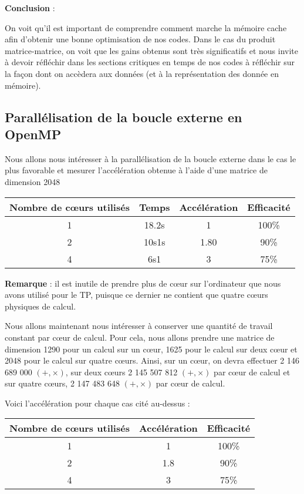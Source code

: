 \documentclass[fleqn,11pt]{article}
\begin{document}
\textbf{Conclusion} : 

On voit qu'il est important de comprendre comment marche la mémoire cache afin d'obtenir une bonne optimisation de nos codes.
Dans le cas du produit matrice-matrice, on voit que les gains obtenus sont très significatifs et nous invite à devoir réfléchir dans les 
sections critiques en temps de nos codes à réfléchir sur la façon dont on accèdera aux données (et à la représentation des donnée en mémoire).

\subsection{Parallélisation de la boucle externe en OpenMP}

Nous allons nous intéresser à la parallélisation de la boucle externe dans le cas le plus favorable et mesurer l'accélération obtenue
à l'aide d'une matrice de dimension 2048

\begin{tabular}{|c|c|c|c|}\hline 
    Nombre de c{\oe}urs utilisés & Temps & Accélération & Efficacité \\ \hline \hline
              1                  & 18.2s &      1       &    100\%   \\ \hline
              2                  & 10s1s &      1.80    &     90\%   \\ \hline
              4                  &  6s1  &      3       &     75\%   \\ \hline 
\end{tabular}

\textbf{Remarque} : il est inutile de prendre plus de c{\oe}ur sur l'ordinateur que nous avons utilisé pour le TP, puisque ce dernier ne 
contient que quatre c{\oe}urs physiques de calcul.

Nous allons maintenant nous intéresser à conserver une quantité de travail constant par c{\oe}ur de calcul. Pour cela, nous allons
prendre une matrice de dimension 1290 pour un calcul sur un c{\oe}ur, 1625 pour le calcul sur deux c{\oe}ur et 2048 pour le calcul 
sur quatre c{\oe}urs. Ainsi, sur un c{\oe}ur, on devra effectuer 2 146 689 000 $(+,\times)$, sur deux c{\oe}urs 2 145 507 812 $(+,\times)$
par c{\oe}ur de calcul et sur quatre c{\oe}urs, 2 147 483 648 $(+,\times)$ par c{\oe}ur de calcul.

Voici l'accélération pour chaque cas cité au-dessus :

\begin{tabular}{|c|c|c|}\hline 
    Nombre de c{\oe}urs utilisés & Accélération & Efficacité \\ \hline \hline
              1                  &      1       &    100\%   \\ \hline
              2                  &      1.8     &     90\%   \\ \hline
              4                  &      3       &     75\%   \\      \hline 
\end{tabular}
\end{document}
